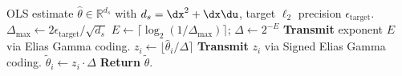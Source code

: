 \documentclass[11pt,journal,onecolumn]{IEEEtran}
\begin{document}
\begin{algorithm}
    \caption{\textsc{AbsoluteInit}$(\hat\theta,\, \epsilon_{\mathrm{target}})$}
    \label{alg:absoluteinit}
    \begin{algorithmic}[1]
        \Require OLS estimate $\hat\theta \in \mathbb{R}^{d_s}$ with $d_s = \dx^2 + \dx\du$, target $\ell_2$ precision $\epsilon_{\mathrm{target}}$.
        \vspace{0.3em}
        \State $\Delta_{\max} \gets 2\epsilon_{\mathrm{target}} / \sqrt{d_s}$ 
        \State $E \gets \lceil \log_2(1/\Delta_{\max}) \rceil$; \quad $\Delta \gets 2^{-E}$ 
        \State \textbf{Transmit} exponent $E$ via Elias Gamma coding.
            \State $z_i \gets \lfloor \hat\theta_i / \Delta \rceil$ 
            \State \textbf{Transmit} $z_i$ via Signed Elias Gamma coding.
            \State $\tilde\theta_i \gets z_i \cdot \Delta$
        \EndFor
        \State \textbf{Return} $\tilde\theta$. 
    \end{algorithmic}
\end{algorithm}
\end{document}
